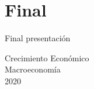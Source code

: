 \documentclass[t,11pt]{beamer}
\begin{document}
\section{Final}


\begin{frame}{Final presentación}
\vfill %
\begin{center}
\alert{\large Crecimiento Económico}\\
{\LARGE Macroeconomía}\\
{\tiny 2020}
\end{center}
\end{frame}
\end{document}
